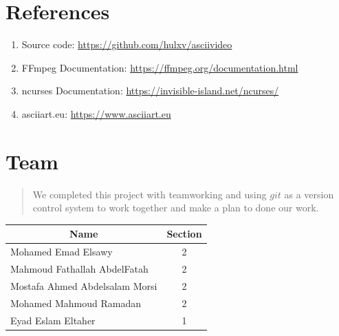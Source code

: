 \documentclass[a4paper,12pt]{article}
\begin{document}
\section{References}
\begin{enumerate}
    \item Source code: \url{https://github.com/hulxv/asciivideo}
    \item FFmpeg Documentation: \url{https://ffmpeg.org/documentation.html}
    \item ncurses Documentation: \url{https://invisible-island.net/ncurses/}
    \item asciiart.eu: \url{https://www.asciiart.eu}
\end{enumerate}


\newpage

\section{Team}
\begin{quote}
    
    We completed this project with teamworking and using $git$ as a version control system to work together and make a plan to done our work.
\end{quote}

    
\begin{table}[]
    \centering
    \Large
\begin{tabular}{@{}lc@{}}
\multicolumn{1}{c}{Name}       & Section \\ 
\hline
Mohamed Emad Elsawy            & 2      \\
Mahmoud Fathallah AbdelFatah   & 2      \\
Mostafa Ahmed Abdelsalam Morsi & 2      \\
Mohamed Mahmoud Ramadan        & 2      \\
Eyad Eslam Eltaher             & 1      \\ 
\end{tabular}
\end{table}
    
\end{document}
